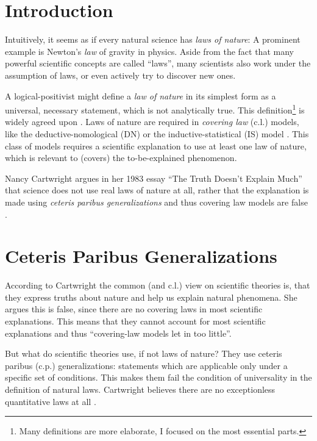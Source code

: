 \section*{Introduction}
Intuitively, it seems as if every natural science has \emph{laws of nature}:
A prominent example is Newton's \emph{law} of gravity in physics.
Aside from the fact that many powerful scientific concepts are called \enquote{laws},
many scientists also work under the assumption of laws, or
even actively try to discover new ones.

A logical-positivist might define a \emph{law of nature} in its simplest form as
a universal, necessary statement, which is not analytically true.
This definition\footnote{Many definitions are more elaborate,
    I focused on the most essential parts.}
is widely agreed upon \cite[57]{philsciencebook}.
Laws of nature are required in \emph{covering law} (c.l.) models, like the
deductive-nomological (DN)
or the inductive-statistical (IS) model \cite[Ch. 3]{philsciencebook}.
This class of models requires a scientific explanation to
use at least one law of nature, which is relevant to (covers) the to-be-explained phenomenon.

Nancy Cartwright argues in her 1983 essay \enquote{The Truth Doesn't Explain Much}
that science does not use real laws of nature at all, rather that the explanation
is made using \emph{ceteris paribus generalizations} and thus
covering law models are false \cite{cartwright1980truth}.


\section*{Ceteris Paribus Generalizations}
According to Cartwright the common (and c.l.) view on scientific theories is, that they
express truths about nature and help us explain natural phenomena.
She argues this is false, since there are no covering laws
in most scientific explanations.
This means that they cannot account for most scientific explanations and thus
\enquote{covering-law models let in too little}\cite[2]{cartwright1980truth}.

But what do scientific theories use, if not laws of nature?
They use ceteris paribus (c.p.) generalizations:
statements which are applicable only under a specific set of conditions.
This makes them fail the condition of universality in the
definition of natural laws.
Cartwright believes there are no
exceptionless quantitative laws at all \cite[2]{cartwright1980truth}.

